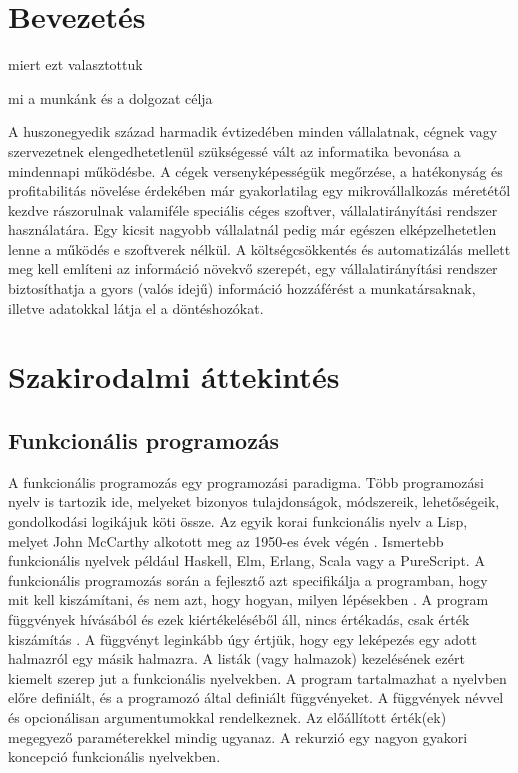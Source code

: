 \documentclass[12pt]{article}
\begin{document}
\section*{Bevezetés}

miert ezt valasztottuk

mi a munkánk és a dolgozat célja

A huszonegyedik század harmadik évtizedében minden vállalatnak, cégnek vagy szervezetnek elengedhetetlenül szükségessé vált az informatika bevonása a mindennapi működésbe. A cégek versenyképességük megőrzése, a hatékonyság és profitabilitás növelése érdekében már gyakorlatilag egy mikrovállalkozás méretétől kezdve rászorulnak valamiféle speciális céges szoftver, vállalatirányítási rendszer használatára. Egy kicsit nagyobb vállalatnál pedig már egészen elképzelhetetlen lenne a működés e szoftverek nélkül. A költségcsökkentés és automatizálás mellett meg kell említeni az információ növekvő szerepét, egy vállalatirányítási rendszer biztosíthatja a gyors (valós idejű) információ hozzáférést a munkatársaknak, illetve adatokkal látja el a döntéshozókat.

\newpage
\section{Szakirodalmi áttekintés}

\subsection{Funkcionális programozás}
A funkcionális programozás egy programozási paradigma. Több programozási nyelv is tartozik ide, melyeket bizonyos tulajdonságok, módszereik, lehetőségeik, gondolkodási logikájuk köti össze. Az egyik korai funkcionális nyelv a Lisp, melyet John McCarthy alkotott meg az 1950-es évek végén \cite{JM}. Ismertebb funkcionális nyelvek például Haskell, Elm, Erlang, Scala vagy a PureScript. 
A funkcionális programozás során a fejlesztő azt specifikálja a programban, hogy mit kell kiszámítani, és nem azt, hogy hogyan, milyen lépésekben \cite{VD}. A program függvények hívásából és ezek kiértékeléséből áll, nincs értékadás, csak érték kiszámítás \cite{VD}. A függvényt leginkább úgy értjük, hogy egy leképezés egy adott halmazról egy másik halmazra\cite{sy}. A listák (vagy halmazok) kezelésének ezért kiemelt szerep jut a funkcionális nyelvekben. A program tartalmazhat a nyelvben előre definiált, és a programozó által definiált függvényeket. A függvények névvel és opcionálisan argumentumokkal rendelkeznek. Az előállított érték(ek) megegyező paraméterekkel mindig ugyanaz. A rekurzió egy nagyon gyakori koncepció funkcionális nyelvekben.
\end{document}
